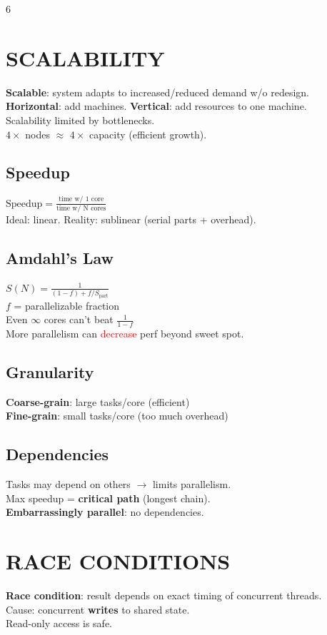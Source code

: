 \documentclass[10pt,landscape,letterpaper]{article}
\newcommand{\concept}[1]{\textcolor{conceptcyan}{\textbf{#1}}}
\newcommand{\category}[1]{\textcolor{categorygreen}{\textbf{#1}}}
\newcommand{\important}[1]{\colorbox{highlightyellow}{#1}}
\begin{document}
\begin{multicols}{6}

\section{SCALABILITY}
\concept{Scalable}: system adapts to increased/reduced demand w/o redesign.
\category{Horizontal}: add machines.
\category{Vertical}: add resources to one machine.\\
Scalability limited by \important{bottlenecks}.\\
$4\times$ nodes $\approx$ $4\times$ capacity (efficient growth).

\subsection{Speedup}
$\text{Speedup} = \frac{\text{time w/ 1 core}}{\text{time w/ N cores}}$\\
Ideal: linear. Reality: sublinear (serial parts + overhead).

\subsection{Amdahl's Law}
\important{$S(N) = \frac{1}{(1-f) + f/S_{\text{part}}}$}\\
$f$ = parallelizable fraction\\
Even $\infty$ cores can't beat $\frac{1}{1-f}$\\
More parallelism can \textcolor{red}{decrease} perf beyond sweet spot.

\subsection{Granularity}
\category{Coarse-grain}: large tasks/core (efficient)\\
\category{Fine-grain}: small tasks/core (too much overhead)

\subsection{Dependencies}
Tasks may depend on others $\to$ limits parallelism.\\
Max speedup = \concept{critical path} (longest chain).\\
\concept{Embarrassingly parallel}: no dependencies.

\section{RACE CONDITIONS}
\concept{Race condition}: result depends on exact timing of concurrent threads.\\
Cause: concurrent \textbf{writes} to shared state.\\
Read-only access is safe.


\end{multicols}
\end{document}
